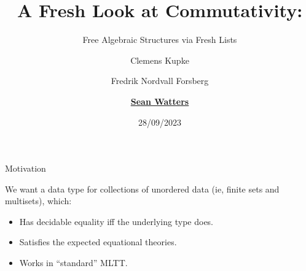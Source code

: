 \documentclass[aspectratio=169]{beamer}
\title[A Fresh Look at Commutativity]{A Fresh Look at Commutativity:}
\subtitle{Free Algebraic Structures via Fresh Lists}
\author[S. Watters]{Clemens Kupke \and Fredrik Nordvall Forsberg \and \underline{\textbf{Sean Watters}}}
\institute{University of Strathclyde}
\date{28/09/2023}
\newcommand{\xvar}{\AgdaBound{$x$}}
\newcommand{\yvar}{\AgdaBound{$y$}}
\newcommand{\nil}{\AgdaField{$[]$}}
\newcommand{\cons}{\AgdaField{$\dblcolon$}}
\newcommand{\phitm}{\AgdaFunction{$\phi$}}
\newcommand{\datatm}{\AgdaDatatype{Tm}}
\newcommand{\abstm}{\AgdaField{abs}}
\begin{document}
\begin{frame}
  \titlepage{}
\end{frame}

\begin{frame}{Motivation}

  We want a data type for collections of unordered data (ie, finite sets and multisets), which:
  \begin{itemize}
          \smallskip
    \item Has decidable equality iff the underlying type does.
          \smallskip
    \item Satisfies the expected equational theories.
          \smallskip
    \item Works in ``standard'' MLTT.
  \end{itemize}




\end{frame}




\end{document}
